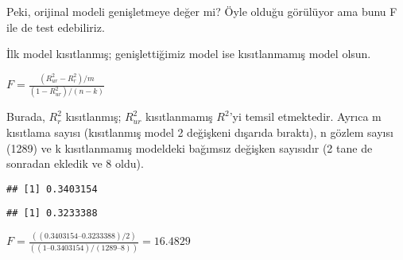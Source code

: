 \documentclass[
]{book}
\newenvironment{Shaded}{\begin{snugshade}}{\end{snugshade}}
\newcommand{\CommentTok}[1]{\textcolor[rgb]{0.56,0.35,0.01}{\textit{#1}}}
\newcommand{\DataTypeTok}[1]{\textcolor[rgb]{0.13,0.29,0.53}{#1}}
\newcommand{\KeywordTok}[1]{\textcolor[rgb]{0.13,0.29,0.53}{\textbf{#1}}}
\newcommand{\NormalTok}[1]{#1}
\newcommand{\OperatorTok}[1]{\textcolor[rgb]{0.81,0.36,0.00}{\textbf{#1}}}
\newcommand{\StringTok}[1]{\textcolor[rgb]{0.31,0.60,0.02}{#1}}
\begin{document}
Peki, orijinal modeli genişletmeye değer mi? Öyle olduğu görülüyor ama bunu F ile de test edebiliriz.

İlk model kısıtlanmış; genişlettiğimiz model ise kısıtlanmamış model olsun.

\(F = \frac{(R^2_{ur} - R^2_r) / m}{(1 - R^2_{ur}) / (n - k)}\)

Burada, \(R^2_{r}\) kısıtlanmış; \(R^2_{ur}\) kısıtlanmamış \(R^2\)'yi temsil etmektedir. Ayrıca m kısıtlama sayısı (kısıtlanmış model 2 değişkeni dışarıda bıraktı), n gözlem sayısı (1289) ve k kısıtlanmamış modeldeki bağımsız değişken sayısıdır (2 tane de sonradan ekledik ve 8 oldu).

\begin{Shaded}
\end{Shaded}

\begin{verbatim}
## [1] 0.3403154
\end{verbatim}

\begin{Shaded}
\end{Shaded}

\begin{verbatim}
## [1] 0.3233388
\end{verbatim}

\(F = \frac{((0.3403154 – 0.3233388) / 2)}{((1 – 0.3403154) / (1289 – 8))} = 16.4829\)
\end{document}
